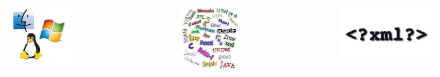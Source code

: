 \documentclass[compress=true]{beamer}
\begin{document}
\begin{frame}
\begin{columns}
	\end{columns}
	\begin{columns}
		\begin{column}{0.333\textwidth}
			\begin{figure}
				\includegraphics[height=0.22\textheight]{os.png}
			\end{figure}
		\end{column}
		\begin{column}{0.334\textwidth}
			\begin{figure}
				\includegraphics[height=0.22\textheight]{languages_2.png}
			\end{figure}
		\end{column}
		\begin{column}{0.333\textwidth}
			\begin{figure}
				\includegraphics[height=0.22\textheight]{xml.jpg}
			\end{figure}
		\end{column}

\end{columns}
\end{frame}
\end{document}
